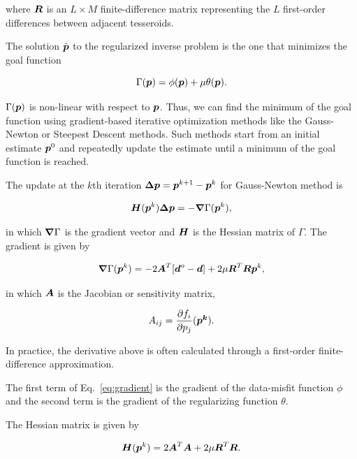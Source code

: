 \documentclass[extra]{gji}
\newcommand{\eq}[1]{Eq.~\ref{eq:#1}}
\newcommand{\mbf}[1]{\hbox{\mathversion{bold}$#1$}}
\begin{document}
\noindent where $\mbf{R}$ is an $L \times M$ finite-difference matrix
representing the $L$ first-order differences between adjacent tesseroids.

The solution $\hat{\mbf{p}}$ to the regularized inverse problem is the one that
minimizes the goal function

\begin{equation}
    \Gamma(\mbf{p}) = \phi(\mbf{p}) + \mu\theta(\mbf{p}).
\end{equation}

\noindent $\Gamma(\mbf{p})$ is non-linear with respect to $\mbf{p}$.
Thus, we can find the minimum of the goal function using gradient-based
iterative optimization
methods like the Gauss-Newton or Steepest Descent methods.
Such methods start from an initial estimate $\mbf{p}^0$ and repeatedly update
the estimate until a minimum of the goal function is reached.

The update at the $k$th iteration $\mbf{\Delta p} = \mbf{p}^{k+1} - \mbf{p}^k$
for Gauss-Newton method is

\begin{equation}
    \mbf{H}(\mbf{p}^k)\mbf{\Delta p} = -\mbf{\nabla}\Gamma(\mbf{p}^k),
\end{equation}

\noindent in which
$\mbf{\nabla}\Gamma$ is the gradient vector and
$\mbf{H}$ is the Hessian matrix of $\Gamma$.
The gradient is given by

\begin{equation}
    \mbf{\nabla}\Gamma(\mbf{p}^k) =
    -2\mbf{A}^T[\mbf{d}^o - \mbf{d}] +
    2\mu\mbf{R}^T\mbf{R}\mbf{p}^k,
    \label{eq:gradient}
\end{equation}

\noindent in which
$\mbf{A}$ is the Jacobian or sensitivity matrix,

\begin{equation}
    A_{ij} = \dfrac{\partial f_i}{\partial p_j}(\mbf{p^k}).
\end{equation}

\noindent
In practice, the derivative above is often calculated through a first-order
finite-difference approximation.

The first term of \eq{gradient} is the gradient of the data-misfit
function $\phi$ and the second term is the gradient of the regularizing
function $\theta$.

The Hessian matrix is given by

\begin{equation}
    \mbf{H}(\mbf{p}^k) = 2\mbf{A}^T\mbf{A} +
    2\mu\mbf{R}^T\mbf{R}.
    \label{eq:hessian}
\end{equation}
\end{document}
